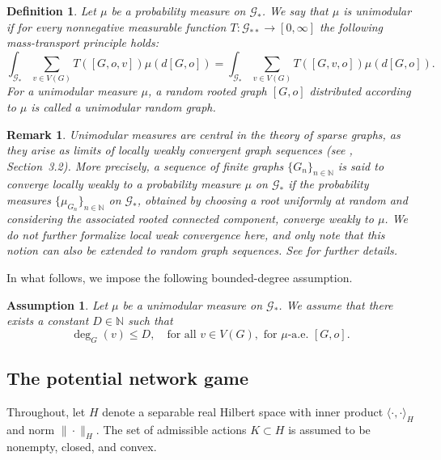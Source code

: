 \documentclass[11pt]{article}
\newcommand{\N}{{\mathbb N}}
\newcommand{\be}{\begin{equation}}
\newcommand{\ee}{\end{equation}}
\newtheorem{remark}[theorem]{Remark}
\newtheorem{definition}[theorem]{Definition}
\newtheorem{assumption}[theorem]{Assumption}
\numberwithin{equation}{section}
\begin{document}
\begin{definition}
Let \(\mu\) be a probability measure on \(\mathcal G_\ast\). We say that \(\mu\) is unimodular if for every nonnegative measurable function $T:\mathcal G_{\ast\ast}\to [0,\infty]$ the following mass-transport principle holds:
\begin{equation} \label{eq:MTP}
\int_{\mathcal G_\ast} \sum_{v\in V(G)} T([G,o,v])\mu(d[G,o])=
\int_{\mathcal G_\ast} \sum_{v\in V(G)} T([G,v,o])\mu(d[G,o]).
\end{equation}
For a unimodular measure \(\mu\), a random rooted graph \([G,o]\) distributed according to $\mu$ is called a unimodular random graph.
\end{definition}
\begin{remark}\label{rem:local-weak-convergence}
Unimodular measures are central in the theory of sparse graphs, as they arise as limits of locally weakly convergent graph sequences (see \cite{benjamini2001recurrence}, Section~3.2). More precisely, a sequence of finite graphs \(\{G_n\}_{n\in\N}\) is said to converge locally weakly to a probability measure \(\mu\) on \(\mathcal G_\ast\) if the probability measures \(\{\mu_{G_n}\}_{n\in\N}\) on \(\mathcal G_\ast\), obtained by choosing a root uniformly at random and considering the associated rooted connected component, converge weakly to \(\mu\). We do not further formalize local weak convergence here, and only note that this notion can also be extended to random graph sequences. See \cite{Aldous2007,aldous2004objective,benjamini2001recurrence,bordenave2016lecture,van2024random} for further details.
\end{remark}

In what follows, we impose the following bounded-degree assumption.
\begin{assumption}\label{ass:degree-bound}
Let $\mu$ be a unimodular measure on $\mathcal{G}_\ast$. We assume that there exists a constant \(D\in\mathbb N\) such that
\be\label{eq:degree-bound}
\deg_G(v)\le D, \quad\text{for all } v\in V(G), \text{ for } \mu\text{-a.e. } [G,o].  
\ee
\end{assumption}

\subsection{The potential network game}

Throughout, let \(H\) denote a separable real Hilbert space with inner product \(\langle \cdot,\cdot\rangle_H\) and norm \(\|\cdot\|_H\). The set of admissible actions \(K\subset H\) is assumed to be nonempty, closed, and convex.
\end{document}
